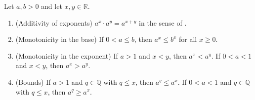 \begin{theorem} \label{theorem:properties_of_exponents_of_real_numbers_by_real_numbers}
    Let $a,b > 0$ and let $x,y \in \mathbb{R}$.

    \begin{enumerate}
        \item (Additivity of exponents) $a^x \cdot a^y = a^{x+y}$ in the sense of .
        \item (Monotonicity in the base) If $0 < a \leq b$, then $a^x \leq b^x$ for all $x \geq 0$.
        \item (Monotonicity in the exponent) If $a > 1$ and $x < y$, then $a^x < a^y$. If $0 < a < 1$ and $x < y$, then $a^x > a^y$.
        \item (Bounds) If $a > 1$ and $q \in \mathbb{Q}$ with $q \leq x$, then $a^q \leq a^x$. If $0 < a < 1$ and $q \in \mathbb{Q}$ with $q \leq x$, then $a^q \geq a^x$.
    \end{enumerate}
\end{theorem}

